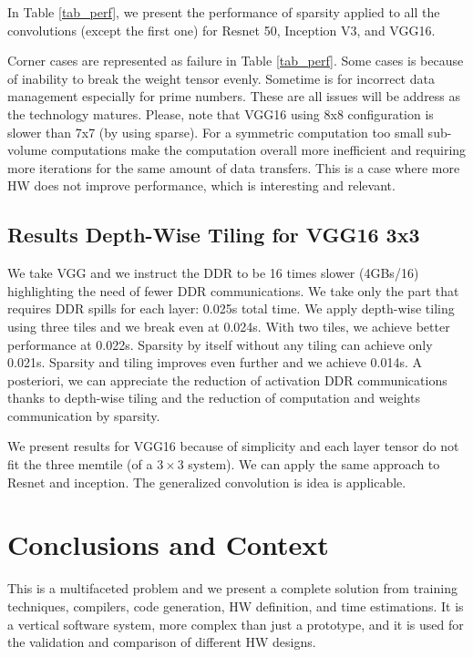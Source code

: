 \documentclass{IEEEtran}
\begin{document}
In Table \ref{tab_perf}, we present the performance of sparsity
applied to all the convolutions (except the first one) for Resnet 50,
Inception V3, and VGG16.

Corner cases are represented as failure in Table \ref{tab_perf}. Some
cases is because of inability to break the weight tensor evenly.
Sometime is for incorrect data management especially for prime
numbers. These are all issues will be address as the technology
matures. Please, note that VGG16 using 8x8 configuration is slower
than 7x7 (by using sparse).  For a symmetric computation too small
sub-volume computations make the computation overall more inefficient
and requiring more iterations for the same amount of data
transfers. This is a case where more HW does not improve performance,
which is interesting and relevant.

\subsection{Results Depth-Wise Tiling for VGG16 3x3}
\label{sec:res-depth}

We take VGG and we instruct the DDR to be 16 times slower (4GBs/16)
highlighting the need of fewer DDR communications. We take only the
part that requires DDR spills for each layer: 0.025s total time.  We
apply depth-wise tiling using three tiles and we break even at
0.024s. With two tiles, we achieve better performance at
0.022s. Sparsity by itself without any tiling can achieve only
0.021s. Sparsity and tiling improves even further and we achieve
0.014s. A posteriori, we can appreciate the reduction of activation
DDR communications thanks to depth-wise tiling and the reduction of
computation and weights communication by sparsity.

We present results for VGG16 because of simplicity and each layer
tensor do not fit the three memtile (of a $3\times 3$ system). We can
apply the same approach to Resnet and inception. The generalized
convolution is idea is applicable.


\section{Conclusions and Context}
This is a multifaceted problem and we present a complete solution from
training techniques, compilers, code generation, HW definition, and
time estimations. It is a vertical software system, more complex than
just a prototype, and it is used for the validation and comparison of
different HW designs.
\end{document}
